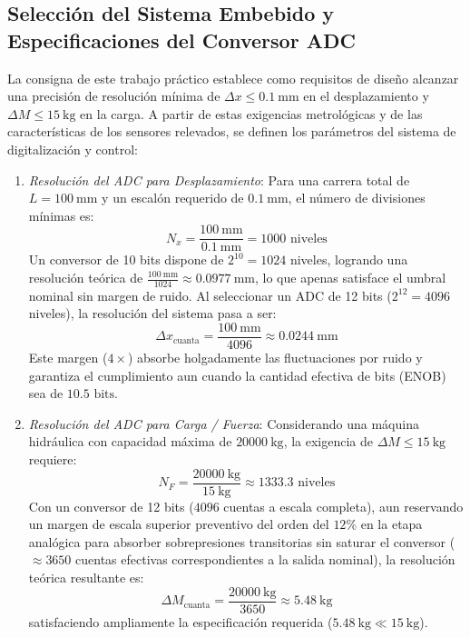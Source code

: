 \subsection{Selección del Sistema Embebido y Especificaciones del Conversor ADC}
La consigna de este trabajo práctico establece como requisitos de diseño alcanzar una precisión de resolución mínima de
$\Delta x \le \qty{0.1}{\milli\meter}$ en el desplazamiento y $\Delta M \le \qty{15}{\kilogram}$ en la carga. A partir de
estas exigencias metrológicas y de las características de los sensores relevados, se definen los parámetros del sistema
de digitalización y control:
\begin{enumerate}
    \item \emph{Resolución del ADC para Desplazamiento}: Para una carrera total de $L = \qty{100}{\milli\meter}$ y un
    escalón requerido de $\qty{0.1}{\milli\meter}$, el número de divisiones mínimas es:
    \[
        N_x = \frac{\qty{100}{\milli\meter}}{\qty{0.1}{\milli\meter}} = 1000\text{ niveles}
    \]
    Un conversor de 10 bits dispone de $2^{10} = 1024$ niveles, logrando una resolución teórica de
    $\frac{\qty{100}{\milli\meter}}{1024} \approx \qty{0.0977}{\milli\meter}$, lo que apenas satisface el umbral
    nominal sin margen de ruido. Al seleccionar un ADC de 12 bits ($2^{12} = 4096$ niveles), la resolución del
    sistema pasa a ser:
    \[
        \Delta x_{\text{cuanta}} = \frac{\qty{100}{\milli\meter}}{4096} \approx \qty{0.0244}{\milli\meter}
    \]
    Este margen ($4\times$) absorbe holgadamente las fluctuaciones por ruido y garantiza el cumplimiento aun
    cuando la cantidad efectiva de bits (ENOB) sea de $10.5\text{ bits}$.
    \item \emph{Resolución del ADC para Carga / Fuerza}: Considerando una máquina hidráulica con capacidad máxima de
    $\qty{20000}{\kilogram}$, la exigencia de $\Delta M \le \qty{15}{\kilogram}$ requiere:
    \[
        N_F = \frac{\qty{20000}{\kilogram}}{\qty{15}{\kilogram}} \approx 1333.3\text{ niveles}
    \]
    Con un conversor de 12 bits ($4096$ cuentas a escala completa), aun reservando un margen de escala superior
    preventivo del orden del $12\%$ en la etapa analógica para absorber sobrepresiones transitorias sin
    saturar el conversor ($\approx 3650$ cuentas efectivas correspondientes a la salida nominal), la resolución teórica
    resultante es:
    \[
        \Delta M_{\text{cuanta}} = \frac{\qty{20000}{\kilogram}}{3650} \approx \qty{5.48}{\kilogram}
    \]
    satisfaciendo ampliamente la especificación requerida ($\qty{5.48}{\kilogram} \ll \qty{15}{\kilogram}$).

\end{enumerate}
